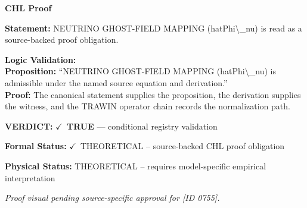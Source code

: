 \vspace{0.45em}
\noindent\textbf{CHL Proof}\par
\textbf{Statement:} NEUTRINO GHOST-FIELD MAPPING (hatPhi\textbackslash{}\_nu) is read as a source-backed proof obligation.

\textbf{Logic Validation:}\\
\textbf{Proposition:} ``NEUTRINO GHOST-FIELD MAPPING (hatPhi\textbackslash{}\_nu) is admissible under the named source equation and derivation.''\\
\textbf{Proof:} The canonical statement supplies the proposition, the derivation supplies the witness, and the TRAWIN operator chain records the normalization path.

\textbf{VERDICT:} \ensuremath{\checkmark}\ \textbf{TRUE} --- conditional registry validation

\textbf{Formal Status:} \ensuremath{\checkmark}\ THEORETICAL -- source-backed CHL proof obligation

\textbf{Physical Status:} THEORETICAL -- requires model-specific empirical interpretation
\par\vspace{0.45em}
\par
\vfill
\begingroup\footnotesize\itshape
Proof visual pending source-specific approval for [ID 0755].
\par\endgroup
\vfill
\endgroup
\endgroup
